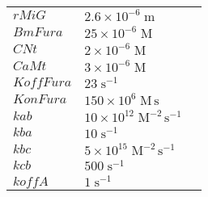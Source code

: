 \documentclass[a4paper,10.0pt]{article}
\begin{document}
{\begin{longtabu}{| l l l |}
  $rMiG$\hspace{0.5cm} & $2.6\!\times\!10 ^{-6}\;\mathrm{m}$\hspace{0.5cm} & \hspace{0.5cm}\\
  $BmFura$\hspace{0.5cm} & $25\!\times\!10 ^{-6}\;\mathrm{M}$\hspace{0.5cm} & \hspace{0.5cm}\\
  $CNt$\hspace{0.5cm} & $2\!\times\!10 ^{-6}\;\mathrm{M}$\hspace{0.5cm} & \hspace{0.5cm}\\
  $CaMt$\hspace{0.5cm} & $3\!\times\!10 ^{-6}\;\mathrm{M}$\hspace{0.5cm} & \hspace{0.5cm}\\
  $KoffFura$\hspace{0.5cm} & $23\;\mathrm{s}^{-1}$\hspace{0.5cm} & \hspace{0.5cm}\\
  $KonFura$\hspace{0.5cm} & $150\!\times\!10 ^{6}\;\mathrm{M}\,\mathrm{s}$\hspace{0.5cm} & \hspace{0.5cm}\\
  $kab$\hspace{0.5cm} & $10\!\times\!10 ^{12}\;\mathrm{M}^{-2}\,\mathrm{s}^{-1}$\hspace{0.5cm} & \hspace{0.5cm}\\
  $kba$\hspace{0.5cm} & $10\;\mathrm{s}^{-1}$\hspace{0.5cm} & \hspace{0.5cm}\\
  $kbc$\hspace{0.5cm} & $5\!\times\!10 ^{15}\;\mathrm{M}^{-2}\,\mathrm{s}^{-1}$\hspace{0.5cm} & \hspace{0.5cm}\\
  $kcb$\hspace{0.5cm} & $500\;\mathrm{s}^{-1}$\hspace{0.5cm} & \hspace{0.5cm}\\
  $koffA$\hspace{0.5cm} & $1\;\mathrm{s}^{-1}$\hspace{0.5cm} & \hspace{0.5cm}\\

\end{longtabu}}
\end{document}
